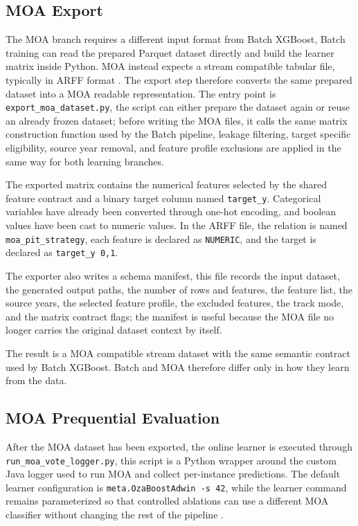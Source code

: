 \subsection{MOA Export}

The MOA branch requires a different input format from Batch XGBoost, Batch training can read the prepared Parquet dataset directly and build the learner matrix inside
Python. MOA instead expects a stream compatible tabular file, typically in ARFF format \cite{bifet2010moa}. The export step therefore converts the same prepared dataset into a 
MOA readable representation.
The entry point is \texttt{export\_moa\_dataset.py}, the script can either prepare the dataset again or reuse an already frozen dataset; before writing the MOA files, it
calls the same matrix construction function used by the Batch pipeline, leakage filtering, target specific eligibility, source
year removal, and feature profile exclusions are applied in the same way for both learning branches.

The exported matrix contains the numerical features selected by the shared feature contract and a binary target column named \texttt{target\_y}. Categorical variables have
already been converted through one-hot encoding, and boolean values have been cast to numeric values. In the ARFF file,
the relation is named \texttt{moa\_pit\_strategy}, each feature is declared as \texttt{NUMERIC}, and the target is declared as \texttt{target\_y {0,1}}.

The exporter also writes a schema manifest, this file records the input dataset, the generated output paths, the number of rows and features, the feature list, the source
years, the selected feature profile, the excluded features, the track mode, and the matrix contract flags; the manifest is useful because the MOA file no longer carries the
original dataset context by itself.

The result is a MOA compatible stream dataset with the same semantic contract used by Batch XGBoost. Batch and MOA therefore differ only in how they learn from the data.


\subsection{MOA Prequential Evaluation}

After the MOA dataset has been exported, the online learner is executed through \texttt{run\_moa\_vote\_logger.py}, this script is a Python wrapper around the custom Java
logger used to run MOA and collect per-instance predictions. The default learner configuration is \texttt{meta.OzaBoostAdwin -s 42}, while the learner command remains
parameterized so that controlled ablations can use a different MOA classifier without changing the rest of the pipeline \cite{bifet2010moa,oza2005boosting,bifet2007adwin}.

